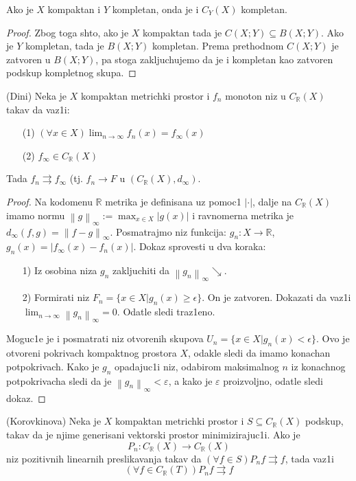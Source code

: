 \documentclass[a4paper,12pt]{article}
\newcommand{\RR}{\mathbb{R}}
\newcommand{\eps}{\varepsilon}
\newcommand{\psj}{\subseteq}
\newcommand{\ds}{\displaystyle}
\newcommand{\norm}[1]{\left\lVert#1\right\rVert}
\begin{document}
\begin{posl}
Ako je $X$ kompaktan i $Y$ kompletan, onda je i $C_Y(X)$ kompletan.
\end{posl}
\begin{proof}
Zbog toga shto, ako je $X$ kompaktan tada je $C(X;Y) \psj B(X;Y)$. Ako je $Y$ kompletan, tada je $B(X;Y)$ kompletan. Prema prethodnom $C(X;Y)$ je zatvoren u $B(X;Y)$, pa stoga zakljuchujemo da je i kompletan kao zatvoren podskup kompletnog skupa.
\end{proof}

\begin{tma}
(Dini) Neka je $X$ kompaktan metrichki prostor i $f_n$ monoton niz u $C_{\RR}(X)$ takav da vaz1i:
\begin{itemize}
	\item[(1)] $\ds{(\forall x \in X) \lim_{n \to \infty} f_n(x) = f_{\infty}(x)}$
	\item[(2)] $f_{\infty} \in C_{\RR}(X)$
\end{itemize}
Tada $f_n \rightrightarrows f_{\infty}$ (tj. $f_n \to F$ u $(C_{\RR}(X), d_{\infty})$.
\end{tma}
\begin{proof}
Na kodomenu $\RR$ metrika je definisana uz pomoc1 $|\cdot |$, dalje na $C_{\RR}(X)$ imamo normu $\norm{g}_{\infty}:= \max_{x\in X}|g(x)|$ i ravnomerna metrika je $d_{\infty}(f,g) = \norm{f - g}_{\infty}$. Posmatrajmo niz funkcija: $g_n:X \to \RR$, $g_n(x) = |f_{\infty}(x) - f_n(x)|$. Dokaz sprovesti u dva koraka:
\begin{itemize}
\item[1)] Iz osobina niza $g_n$ zakljuchiti da $\norm{g_n}_{\infty} \searrow$.
\item[2)] Formirati niz $F_n = \{x \in X | g_n(x) \geq \epsilon \}$. On je zatvoren. Dokazati da vaz1i \\$\lim_{n \to \infty} \norm{g_n}_{\infty} = 0$. Odatle sledi traz1eno.
\end{itemize}

Moguc1e je i posmatrati niz otvorenih skupova $U_n = \{x \in X | g_n(x) < \epsilon \}$. Ovo je otvoreni pokrivach kompaktnog prostora $X$, odakle
	sledi da imamo konachan potpokrivach. Kako je $g_n$ opadajuc1i niz, odabirom maksimalnog $n$ iz konachnog potpokrivacha sledi da je $\norm{g_n}_\infty < \eps$,
	a kako je $\eps$ proizvoljno, odatle sledi dokaz.
\end{proof}

\begin{tma}
(Korovkinova) Neka je $X$ kompaktan metrichki prostor i $S \psj C_{\RR}(X)$ podskup, takav da je njime generisani vektorski prostor minimizirajuc1i. Ako je \[P_n: C_{\RR}(X) \to C_{\RR}(X)\]
 niz pozitivnih linearnih preslikavanja takav da $(\forall f \in S) P_n f \rightrightarrows f$, tada vaz1i
\[(\forall f \in C_{\RR}(T)) P_nf \rightrightarrows f \]
\end{tma}
\end{document}
